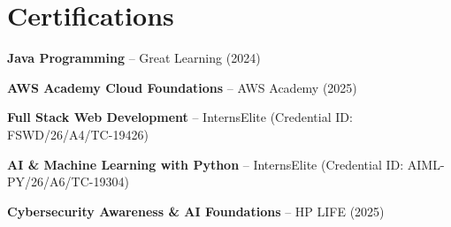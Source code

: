 \documentclass[letterpaper,10pt]{article}
\begin{document}
\section{Certifications}
 \begin{itemize}[leftmargin=0.15in]
    \small{
      \item{\textbf{Java Programming} -- Great Learning (2024) \vspace{-2pt}}
      \item{\textbf{AWS Academy Cloud Foundations} -- AWS Academy (2025) \vspace{-2pt}}
      \item{\textbf{Full Stack Web Development} -- InternsElite (Credential ID: FSWD/26/A4/TC-19426) \vspace{-2pt}}
      \item{\textbf{AI \& Machine Learning with Python} -- InternsElite (Credential ID: AIML-PY/26/A6/TC-19304) \vspace{-2pt}}
      \item{\textbf{Cybersecurity Awareness \& AI Foundations} -- HP LIFE (2025) \vspace{-2pt}}
    }
 \end{itemize}
\end{document}
